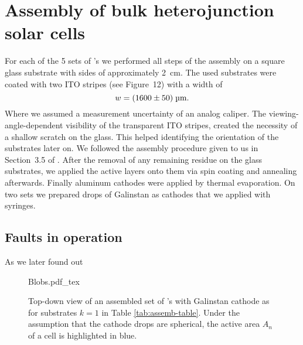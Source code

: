\section{Assembly of bulk heterojunction solar cells}\label{sec:assembly}
For each of the 5 sets of \BHSC's we performed all steps of the assembly on a square glass substrate with sides of approximately 2~cm. The used substrates were coated with two ITO stripes (see \cite{labdesc} Figure~12) with a width of
\begin{equation*}
w = (1600\pm50)\;\text{\textmu m}.
\end{equation*}
Where we assumed a measurement uncertainty of an analog caliper. The viewing-angle-dependent visibility of the transparent ITO stripes, created the necessity of a shallow scratch on the glass. This helped identifying the orientation of the substrates later on.\mypar
We followed the assembly procedure given to us in Section~3.5 of \cite{labdesc}. After the removal of any remaining residue on the glass substrates, we applied the active layers onto them via spin coating and annealing afterwards. Finally aluminum cathodes were applied by thermal evaporation. On two sets we prepared drops of Galinstan as cathodes that we applied with syringes.

\subsection{Faults in operation}
As we later found out

\begin{figure}[h]\centering
{Blobs.pdf_tex}
\caption{Top-down view of an assembled set of \BHSC's with Galinstan cathode as for substrates $k=1$ in Table \ref{tab:assemb-table}. Under the assumption that the cathode drops are spherical, the active area $A_n$ of a cell is highlighted in blue.}
\label{fig:blobs}
\end{figure}


